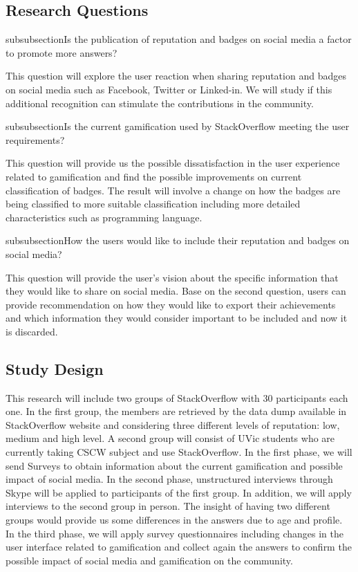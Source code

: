 \documentclass{sigchi}
\begin{document}
\subsection{Research Questions}

subsubsection{Is the publication of reputation and badges on social media a
factor to promote more answers?}

This question will explore the user reaction when sharing reputation and badges
on social media such as Facebook, Twitter or Linked-in. We will study if this
additional recognition can stimulate the contributions in the community.


subsubsection{Is the current gamification used by StackOverflow meeting the
user requirements?}

This question will provide us the possible dissatisfaction in the user
experience related to gamification and find the possible improvements on
current classification of badges. The result will involve a change on how the
badges are being classified to more suitable classification including more
detailed characteristics such as programming language.

subsubsection{How the users would like to include their reputation and badges
on social media?}

This question will provide the user’s vision about the specific information
that they would like to share on social media. Base on the second question,
users can provide recommendation on how they would like to export their
achievements and which information they would consider important to be
included and now it is discarded.


\subsection{Study Design}

This research will include two groups of StackOverflow with 30 participants
each one. In the first group, the members are retrieved by the data dump
available in StackOverflow website and considering three different levels of
reputation: low, medium and high level. A second group will consist of UVic
students who are currently taking CSCW subject and use StackOverflow. In the
first phase, we will send Surveys to obtain information about the current
gamification and possible impact of social media. In the second phase,
unstructured interviews through Skype will be applied to participants of the
first group. In addition, we will apply interviews to the second group in
person. The insight of having two different groups would provide us some
differences in the answers due to age and profile. In the third phase, we will
apply survey questionnaires including changes in the user interface related to
gamification and collect again the answers to confirm the possible impact of
social media and gamification on the community.
\end{document}
